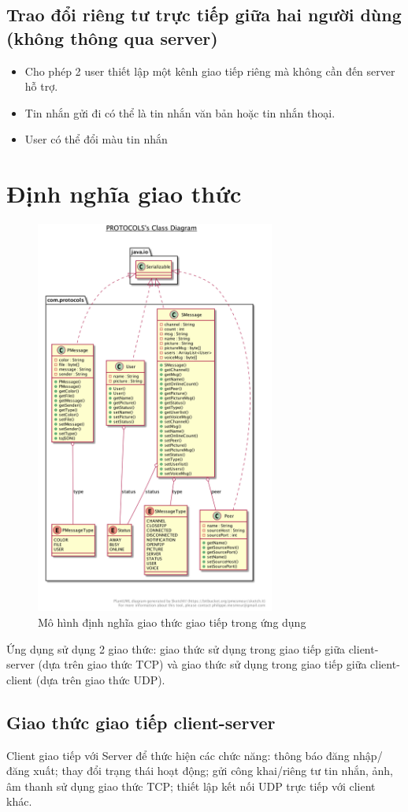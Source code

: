 \documentclass[a4paper]{article}
\begin{document}
	\subsection{Trao đổi riêng tư trực tiếp giữa hai người dùng (không thông qua server)}
	\begin{itemize}
		\item Cho phép 2 user thiết lập một kênh giao tiếp riêng mà không cần đến server hỗ trợ.
		\item Tin nhắn gửi đi có thể là tin nhắn văn bản hoặc tin nhắn thoại.
		\item User có thể đổi màu tin nhắn
	\end{itemize}
\section{Định nghĩa giao thức}
\begin{figure}[h!]
	\centering
	\includegraphics[height=13cm]{protocols}
	\caption{Mô hình định nghĩa giao thức giao tiếp trong ứng dụng}
\end{figure}

Ứng dụng sử dụng 2 giao thức: giao thức sử dụng trong giao tiếp giữa client-server (dựa trên giao thức TCP) và giao thức sử dụng trong giao tiếp giữa client-client (dựa trên giao thức UDP).


\subsection{Giao thức giao tiếp client-server}
Client giao tiếp với Server để thức hiện các chức năng: thông báo đăng nhập/đăng xuất; thay đổi trạng thái hoạt động; gửi công khai/riêng tư tin nhắn, ảnh, âm thanh sử dụng giao thức TCP; thiết lập kết nối UDP trực tiếp với client khác.
\end{document}
